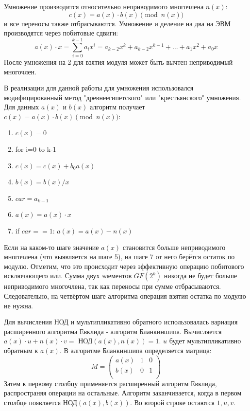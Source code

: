 \documentclass[times,specification,annotation]{itmo-student-thesis}
\begin{document}
Умножение производится относительно неприводимого многочлена $n(x)$:
\[c(x) = a(x) \cdot b(x)\pmod{n(x)}\]
и все переносы также отбрасываются.
Умножение и деление на два  на ЭВМ производятся через побитовые сдвиги:
\[a(x) \cdot x = \sum_{i=0}^{k-1}a_i x^i = a_{k-2}x^{k} + a_{k-2}x^{k-1} + \dots + a_1 x^2 + a_0 x\]
После умножения на 2 для взятия модуля может быть вычтен неприводимый многочлен.

В реализации для данной работы для умножения использовался модифицированный метод "древнеегипетского" или "крестьянского"
умножения.
Для данных $a(x)$ и $b(x)$ алгоритм получает $c(x) = a(x) \cdot b(x) \pmod{n(x)}$:
\begin{enumerate}[label=\arabic*:]
    \item $c(x)=0$
    \item for i=0 to k-1
    \item \hspace*{10mm} $c(x) = c(x) + b_0 a(x)$
    \item \hspace*{10mm} $b(x) = b(x)/x$
    \item \hspace*{10mm} $car = a_{k-1}$
    \item \hspace*{10mm} $a(x) = a(x) \cdot x$
    \item \hspace*{10mm} if $car == 1$: $a(x) = a(x) - n(x)$
\end{enumerate}
Если на каком-то шаге значение $a(x)$ становится больше неприводимого многочлена (что выявляется на шаге 5), на шаге 7
от него берётся остаток по модулю.
Отметим, что это происходит через эффективную операцию побитового исключающего или.
Сумма двух элементов $GF(2^k)$ никогда не будет больше неприводимого многочлена, так как переносы при сумме отбрасываются.
Следовательно, на четвёртом шаге алгоритма операция взятия остатка по модулю не нужна.

Для вычисления НОД и мультипликативно обратного использовалась вариация расширенного алгоритма Евклида
- алгоритм Бланкиншипа.
Вычисляется $a(x) \cdot u + n(x) \cdot v =$ НОД$(a(x), n(x)) = 1$.
$u$ будет мультипликативно обратным к $a(x)$.
В алгоритме Бланкиншипа определяется матрица:
\begin{equation*}
M =
\begin{pmatrix}
a(x) & 1 & 0 \\
b(x) & 0 & 1\\
\end{pmatrix}
\end{equation*}
Затем к первому столбцу применяется расширенный алгоритм Евклида, распространяя операции на остальные.
Алгоритм заканчивается, когда в первом столбце появляется НОД$(a(x), b(x))$.
Во второй строке остаются $1, u, v$.
\end{document}
